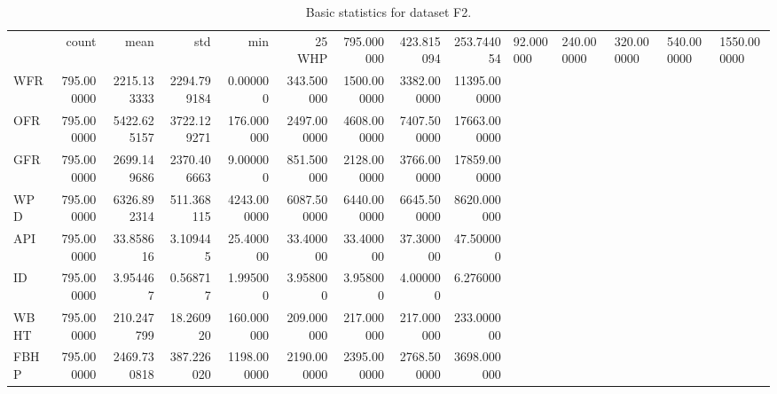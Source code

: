 \begin{table}
\caption{Basic statistics for dataset F2.}
\begin{tabular}{lrrrrrrrr}
\toprule
 & count & mean & std & min & 25%
\midrule
WHP & 795.000000 & 423.815094 & 253.744054 & 92.000000 & 240.000000 & 320.000000 & 540.000000 & 1550.000000 \\
WFR & 795.000000 & 2215.133333 & 2294.799184 & 0.000000 & 343.500000 & 1500.000000 & 3382.000000 & 11395.000000 \\
OFR & 795.000000 & 5422.625157 & 3722.129271 & 176.000000 & 2497.000000 & 4608.000000 & 7407.500000 & 17663.000000 \\
GFR & 795.000000 & 2699.149686 & 2370.406663 & 9.000000 & 851.500000 & 2128.000000 & 3766.000000 & 17859.000000 \\
WPD & 795.000000 & 6326.892314 & 511.368115 & 4243.000000 & 6087.500000 & 6440.000000 & 6645.500000 & 8620.000000 \\
API & 795.000000 & 33.858616 & 3.109445 & 25.400000 & 33.400000 & 33.400000 & 37.300000 & 47.500000 \\
ID & 795.000000 & 3.954467 & 0.568717 & 1.995000 & 3.958000 & 3.958000 & 4.000000 & 6.276000 \\
WBHT & 795.000000 & 210.247799 & 18.260920 & 160.000000 & 209.000000 & 217.000000 & 217.000000 & 233.000000 \\
FBHP & 795.000000 & 2469.730818 & 387.226020 & 1198.000000 & 2190.000000 & 2395.000000 & 2768.500000 & 3698.000000 \\
\bottomrule
\end{tabular}
\end{table}
